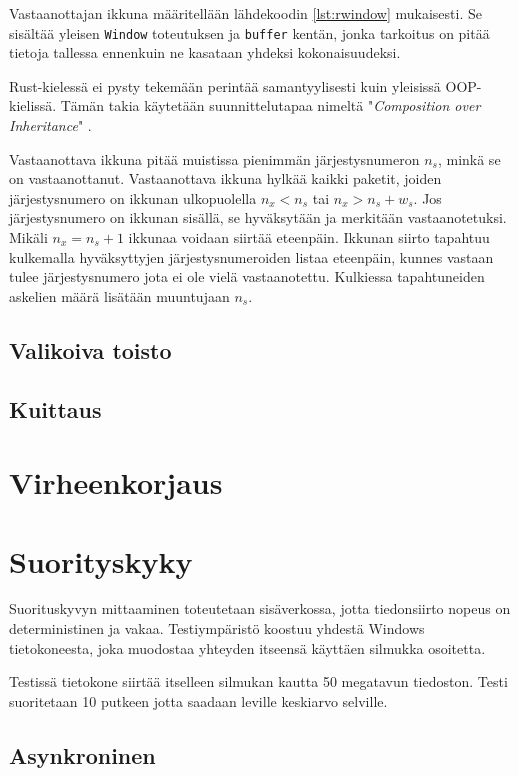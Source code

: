 \documentclass[a4paper,12pt]{article}
\begin{document}
Vastaanottajan ikkuna määritellään lähdekoodin \ref{lst:rwindow} mukaisesti. Se sisältää yleisen \lstinline{Window} toteutuksen ja \lstinline{buffer} kentän, jonka tarkoitus on pitää tietoja 
tallessa ennenkuin ne kasataan yhdeksi kokonaisuudeksi. \par
Rust-kielessä ei pysty tekemään perintää samantyylisesti kuin yleisissä OOP-kielissä. Tämän takia
käytetään suunnittelutapaa nimeltä "\textit{Composition over Inheritance}" \cite{Ivicevic202228Inheritance}.



    Vastaanottava ikkuna pitää muistissa pienimmän järjestysnumeron $n_s$, minkä se on vastaanottanut.
    Vastaanottava ikkuna hylkää kaikki paketit, joiden järjestysnumero on ikkunan ulkopuolella $n_x < n_s$ tai $n_x > n_s + w_s$. Jos järjestysnumero on ikkunan sisällä, se hyväksytään ja merkitään vastaanotetuksi. Mikäli $n_x = n_s + 1$ ikkunaa voidaan siirtää eteenpäin.
    Ikkunan siirto tapahtuu kulkemalla hyväksyttyjen järjestysnumeroiden listaa eteenpäin, kunnes vastaan tulee järjestysnumero jota ei ole vielä vastaanotettu. Kulkiessa tapahtuneiden askelien määrä lisätään muuntujaan $n_s$.

    \subsection{Valikoiva toisto}\label{subsec:valikoiva_toisto}
    \blindtext

    \subsection{Kuittaus}\label{subsec:kuittaus}
    \blindtext


    \section{Virheenkorjaus}\label{sec:virheenkorjaus}
    \blindtext


    \section{Suorityskyky}
    Suorituskyvyn mittaaminen toteutetaan sisäverkossa, jotta tiedonsiirto nopeus on deterministinen ja vakaa.
    Testiympäristö koostuu yhdestä Windows tietokoneesta, joka muodostaa yhteyden itseensä käyttäen silmukka osoitetta.\par
    Testissä tietokone siirtää itselleen silmukan kautta 50 megatavun tiedoston. Testi suoritetaan 10 putkeen jotta saadaan leville keskiarvo selville.

    \subsection{Asynkroninen }
    
    
\end{document}
